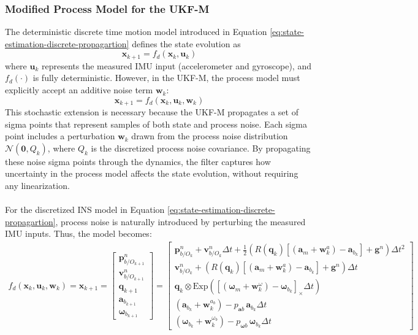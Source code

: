 \subsubsection{Modified Process Model for the UKF-M}
The deterministic discrete time motion model introduced in Equation \ref{eq:state-estimation-discrete-propagartion} defines the state evolution as
$$
    \mathbf{x}_{k+1} = f_d(\mathbf{x}_k, \mathbf{u}_k)
$$
where $\mathbf{u}_k$ represents the measured IMU input (accelerometer and gyroscope), and $f_d(\cdot)$ is fully deterministic. However, in the UKF-M, the process model must explicitly accept an additive noise term $\mathbf{w}_k$:
$$
    \mathbf{x}_{k+1} = f_d(\mathbf{x}_k, \mathbf{u}_k, \mathbf{w}_k)
$$
This stochastic extension is necessary because the UKF-M propagates a set of sigma points that represent samples of both state and process noise. Each sigma point includes a perturbation $\mathbf{w}_k$ drawn from the process noise distribution $\mathcal{N}(\mathbf{0}, Q_k)$, where $Q_k$ is the discretized process noise covariance. By propagating these noise sigma points through the dynamics, the filter captures how uncertainty in the process model affects the state evolution, without requiring any linearization.
\\ \\
For the discretized INS model in Equation \ref{eq:state-estimation-discrete-propagartion}, process noise is naturally introduced by perturbing the measured IMU inputs. Thus, the model becomes:
$$
    \begin{aligned}
        f_d(\mathbf{x}_k, \mathbf{u}_k, \mathbf{w}_k) = 
        \mathbf{x}_{k+1} =
        \begin{bmatrix}
            \mathbf{p}_{b/O_{k+1}}^{n} \\
            \mathbf{v}_{b/O_{k+1}}^{n} \\ 
            \mathbf{q}_{k+1} \\ 
            \mathbf{a}_{b_{k+1}} \\
            \boldsymbol{\omega}_{b_{k+1}}
        \end{bmatrix}
        =
        \begin{bmatrix}
            \mathbf{p}_{b/O_{k}}^{n} + \mathbf{v}_{b/O_{k}}^{n} \Delta t + \tfrac{1}{2}\!\left(R(\mathbf{q}_k)\!\left[(\mathbf{a}_m + \mathbf{w}^{a}_k) - \mathbf{a}_{b_k}\right] + \mathbf{g}^n\right)\!\Delta t^2 \\
            \mathbf{v}_{b/O_{k}}^{n} + \!\left(R(\mathbf{q}_k)\!\left[(\mathbf{a}_m + \mathbf{w}^{a}_k) - \mathbf{a}_{b_k}\right] + \mathbf{g}^n\right)\!\Delta t \\
            \mathbf{q}_{k} \otimes \mathrm{Exp}\!\left([(\boldsymbol{\omega}_m + \mathbf{w}^{\omega}_k) - \boldsymbol{\omega}_{b_k}]_{\times}\Delta t\right) \\
            (\mathbf{a}_{b_{k}} + \mathbf{w}^{a_b}_k) - p_{\mathbf{a}b}\,\mathbf{a}_{b_{k}} \Delta t \\
            (\boldsymbol{\omega}_{b_{k}} + \mathbf{w}^{\omega_b}_k) - p_{\boldsymbol{\omega}b}\,\boldsymbol{\omega}_{b_{k}} \Delta t
        \end{bmatrix}
    \end{aligned}
    \label{eq:state-estimation-discrete-propagartion-modified-with-noise}
$$
